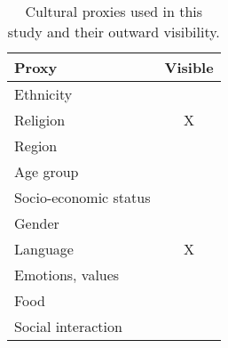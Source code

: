 \begin{table}[H]
	\centering
	\small
	\caption[A demonstration of a table typeset in \LaTeX{}.]{Cultural proxies used in this study and their outward visibility.}
	\begin{tabular}{l|c}
		\toprule
		Proxy & Visible \\
		\midrule
		Ethnicity				& 	\checkmark	 	 \\
		Religion				& 	X	 	 \\
		Region					& 	\checkmark	 	 \\
		Age group				& 	\checkmark	 	 \\
		Socio-economic status	& 	\checkmark	 	 \\
		Gender					& 	\checkmark	 	 \\
		Language				& 	X	 	 \\
		Emotions, values		& 	\checkmark	 	 \\
		Food					& 	\checkmark	 	 \\
		Social interaction		& 	\checkmark	 	 \\
		\bottomrule
	\end{tabular}
	\label{tbl:cultural_proxies}
\end{table}

%
%	
